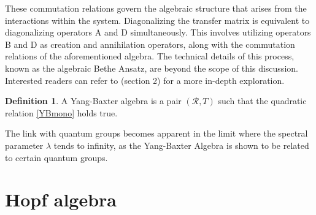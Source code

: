 \documentclass[11pt]{article}
\theoremstyle{definition}
\newtheorem{Def}{Definition}[section]
\begin{document}
These commutation relations govern the algebraic structure that arises from the interactions within the system. Diagonalizing the transfer matrix is equivalent to diagonalizing operators A and D simultaneously. This involves utilizing operators B and D as creation and annihilation operators, along with the commutation relations of the aforementioned algebra. The technical details of this process, known as the algebraic Bethe Ansatz, are beyond the scope of this discussion. Interested readers can refer to \cite{GomezRuizSierra} (section 2) for a more in-depth exploration.

\begin{Def}
A Yang-Baxter algebra is a pair \((\mathcal{R}, T)\) such that the quadratic relation \ref{YBmono} holds true.
\end{Def}

The link with quantum groups becomes apparent in the limit where the spectral parameter \(\lambda\) tends to infinity, as the Yang-Baxter Algebra is shown to be related to certain quantum groups.

\section{\Large \textbf{Hopf algebra}}
\end{document}
